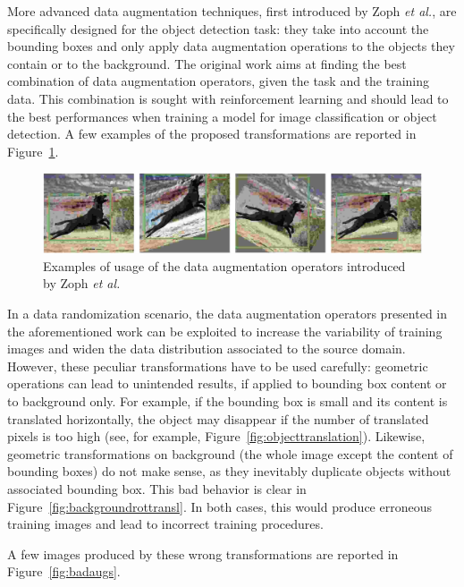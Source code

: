 \documentclass[%
    corpo=12pt,
    twoside,
    stile=classica,   
    tipotesi=magistrale,
    evenboxes,
    english,
	numerazioneromana,
]{toptesi}
\begin{document}
\bigskip
More advanced data augmentation techniques, first introduced by Zoph \textit{et al.}\cite{zoph2019learning}, are specifically designed for the object detection task: they take into account the bounding boxes and only apply data augmentation operations to the objects they contain or to the background. The original work aims at finding the best combination of data augmentation operators, given the task and the training data. This combination is sought with reinforcement learning and should lead to the best performances when training a model for image classification or object detection. A few examples of the proposed transformations are reported in Figure~\ref{fig:learndataaug}.

\begin{figure}[ht!]
	\centering
	\includegraphics[width=0.9\linewidth]{imgs/learndataaug.png}
	\caption{Examples of usage of the data augmentation operators introduced by Zoph \textit{et al.}\cite{zoph2019learning}}
	\label{fig:learndataaug}
\end{figure}

\medskip
In a data randomization scenario, the data augmentation operators presented in the aforementioned work can be exploited to increase the variability of training images and widen the data distribution associated to the source domain. However, these peculiar transformations have to be used carefully: geometric operations can lead to unintended results, if applied to bounding box content or to background only. For example, if the bounding box is small and its content is translated horizontally, the object may disappear if the number of translated pixels is too high (see, for example, Figure~\ref{fig:objecttranslation}). Likewise, geometric transformations on background (the whole image except the content of bounding boxes) do not make sense, as they inevitably duplicate objects without associated bounding box. This bad behavior is clear in Figure~\ref{fig:backgroundrottransl}. In both cases, this would produce erroneous training images and lead to incorrect training procedures.

A few images produced by these wrong transformations are reported in Figure~\ref{fig:badaugs}.
\end{document}
